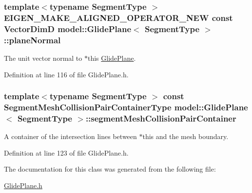 \hypertarget{classmodel_1_1_glide_plane_ac67211af88d7742170cc0987ee584fd6}{}
\subsubsection[{plane\+Normal}]{\setlength{\rightskip}{0pt plus 5cm}template$<$typename Segment\+Type $>$ E\+I\+G\+E\+N\+\_\+\+M\+A\+K\+E\+\_\+\+A\+L\+I\+G\+N\+E\+D\+\_\+\+O\+P\+E\+R\+A\+T\+O\+R\+\_\+\+N\+E\+W const {\bf Vector\+Dim\+D} {\bf model\+::\+Glide\+Plane}$<$ Segment\+Type $>$\+::plane\+Normal}\label{classmodel_1_1_glide_plane_ac67211af88d7742170cc0987ee584fd6}


The unit vector normal to $\ast$this \hyperlink{classmodel_1_1_glide_plane}{Glide\+Plane}. 



Definition at line 116 of file Glide\+Plane.\+h.

\hypertarget{classmodel_1_1_glide_plane_a988884f7402e63da1de4e06ab2e8e785}{}
\subsubsection[{segment\+Mesh\+Collision\+Pair\+Container}]{\setlength{\rightskip}{0pt plus 5cm}template$<$typename Segment\+Type $>$ const {\bf Segment\+Mesh\+Collision\+Pair\+Container\+Type} {\bf model\+::\+Glide\+Plane}$<$ Segment\+Type $>$\+::segment\+Mesh\+Collision\+Pair\+Container}\label{classmodel_1_1_glide_plane_a988884f7402e63da1de4e06ab2e8e785}


A container of the intersection lines between $\ast$this and the mesh boundary. 



Definition at line 123 of file Glide\+Plane.\+h.



The documentation for this class was generated from the following file\+:\begin{DoxyCompactItemize}
\item 
\hyperlink{_glide_plane_8h}{Glide\+Plane.\+h}\end{DoxyCompactItemize}
